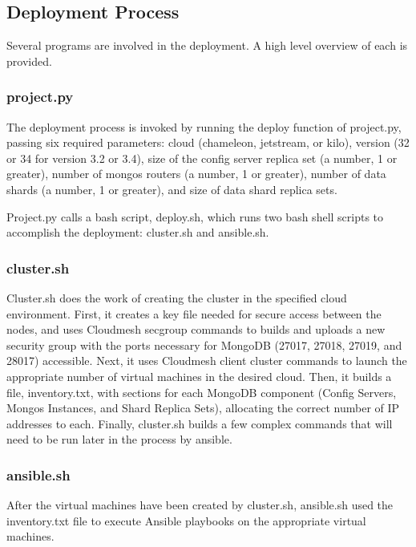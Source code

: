 \documentclass[9pt,twocolumn,twoside]{../../styles/osajnl}
\begin{document}
\subsection{Deployment Process}

Several programs are involved in the deployment.  A high level overview of each is provided.

\subsubsection{project.py}

The deployment process is invoked by running the deploy function of
project.py, passing six required parameters: cloud (chameleon,
jetstream, or kilo), version (32 or 34 for version 3.2 or 3.4), size
of the config server replica set (a number, 1 or greater), number of
mongos routers (a number, 1 or greater), number of data shards (a
number, 1 or greater), and size of data shard replica sets.

Project.py calls a bash script, deploy.sh, which runs two bash shell
scripts to accomplish the deployment: cluster.sh and ansible.sh.

\subsubsection{cluster.sh}

Cluster.sh does the work of creating the cluster in the specified
cloud environment. First, it creates a key file needed for secure
access between the nodes, and uses Cloudmesh secgroup commands to
builds and uploads a new security group with the ports necessary for
MongoDB (27017, 27018, 27019, and 28017) accessible. Next, it uses
Cloudmesh client cluster commands to launch the appropriate number of
virtual machines in the desired cloud. Then, it builds a file,
inventory.txt, with sections for each MongoDB component (Config
Servers, Mongos Instances, and Shard Replica Sets), allocating the
correct number of IP addresses to each. Finally, cluster.sh builds a
few complex commands that will need to be run later in the process by
ansible.

\subsubsection{ansible.sh}

After the virtual machines have been created by cluster.sh, ansible.sh
used the inventory.txt file to execute Ansible playbooks on the
appropriate virtual machines.
\end{document}
